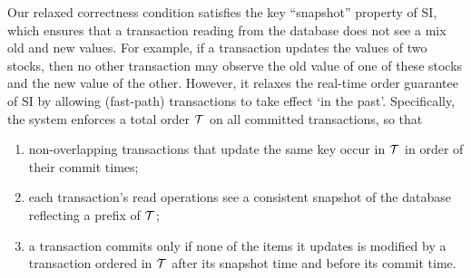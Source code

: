 Our relaxed correctness condition satisfies the key ``snapshot'' property of SI, which ensures that a transaction reading from the  database
does not see a mix old and new values. For example, if a transaction updates the values of two stocks, 
then no other transaction may observe the old value of one of these stocks and the new value of the other.
However, it relaxes the real-time order guarantee of SI by allowing (fast-path) transactions to take effect `in the past'.  
Specifically, %
the system enforces a total order ${\cal T}$ on all committed transactions, so that
\begin{enumerate}
    \setlength{\itemsep}{0pt}
    \setlength{\parskip}{0pt}
    \setlength{\parsep}{2pt}  
\item
non-overlapping transactions 
that update the same key occur in ${\cal T}$  in order of their commit times;
\item
each  transaction's read operations see a consistent snapshot of the database reflecting 
a prefix of  ${\cal T}$; 
\item
 a transaction commits only if none of the items it updates is modified by a transaction ordered in ${\cal T}$ after
 its snapshot time and before its commit time.
 \end{enumerate}

